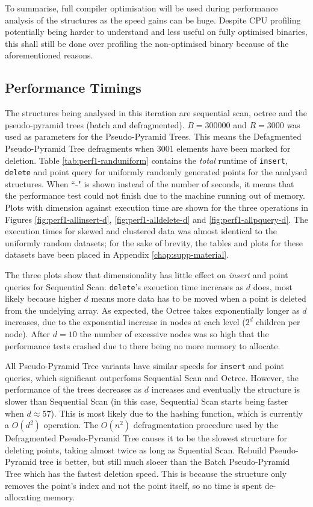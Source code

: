 To summarise, full compiler optimisation will be used during performance analysis of the structures as the speed gains can be huge. Despite CPU profiling potentially being harder to understand and less useful on fully optimised binaries, this shall still be done over profiling the non-optimised binary because of the aforementioned reasons.

\subsection{Performance Timings}

The structures being analysed in this iteration are sequential scan, octree and the pseudo-pyramid trees (batch and defragmented). $B = 300000$ and $R=3000$ was used as parameters for the Pseudo-Pyramid Trees. This means the Defagmented Pseudo-Pyramid Tree defragments when 3001 elements have been marked for deletion. Table \ref{tab:perf1-randuniform} contains the \textit{total} runtime of \texttt{insert}, \texttt{delete} and point query for uniformly randomly generated points for the analysed structures. When ``-" is shown instead of the number of seconds, it means that the performance test could not finish due to the machine running out of memory. Plots with dimension against execution time are shown for the three operations in Figures \ref{fig:perf1-allinsert-d}, \ref{fig:perf1-alldelete-d} and \ref{fig:perf1-allpquery-d}. The execution times for skewed and clustered data was almost identical to the uniformly random datasets; for the sake of brevity, the tables and plots for these datasets have been placed in Appendix \ref{chap:supp-material}. 

The three plots show that dimensionality has little effect on \textit{insert} and point queries for Sequential Scan. \texttt{delete}'s exeuction time increases as $d$ does, most likely because higher $d$ means more data has to be moved when a point is deleted from the undelying array. As expected, the Octree takes exponentially longer as $d$ increases, due to the exponential increase in nodes at each level ($2^d$ children per node). After $d = 10$ the number of excessive nodes was so high that the performance tests crashed due to there being no more memory to allocate.

All Pseudo-Pyramid Tree variants have similar speeds for \texttt{insert} and point queries, which significant outperfoms Sequential Scan and Octree. However, the performance of the trees decreases as $d$ increases and eventually the structure is slower than Sequential Scan (in this case, Sequential Scan starts being faster when $d \approx 57$). This is most likely due to the hashing function, which is currently a $O(d^2)$ operation. The $O(n^2)$ defragmentation procedure used by the Defragmented Pseudo-Pyramid Tree causes it to be the slowest structure for deleting points, taking almost twice as long as Squential Scan. Rebuild Pseudo-Pyramid tree is better, but still much sloeer than the Batch Pseudo-Pyramid Tree which has the fastest deletion speed. This is because the structure only removes the point's index and not the point itself, so no time is spent de-allocating memory.

